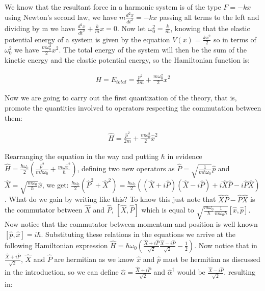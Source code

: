 \documentclass[
  journal=largetwo,
  year=2023,
]{cup-journal}
\begin{document}
We know that the resultant force in a harmonic system is of the type \(F = -kx\) using Newton's second law, we have \(m\frac{d^2x}{dt^2} = -kx\) passing all terms to the left and dividing by m we have \(\frac{d^2x}{dt^2} + \frac{k}{m}x = 0\). Now let \(\omega_0^{2} = \frac{k}{m}\), knowing that the elastic potential energy of a system is given by the equation \(V(x) = \frac{kx^2}{2}\) so in terms of \(\omega_0^{2}\) we have \(\frac{m\omega_0^{2}}{2}x^2\). The total energy of the system will then be the sum of the kinetic energy and the elastic potential energy, so the Hamiltonian function is:

\begin{equation}
  \begin{aligned}\label{eq:8}
    H = E_{total} = \frac{p^2}{2m} + \frac{m\omega_0^{2}}{2}x^2
  \end{aligned}
\end{equation}


Now we are going to carry out the first quantization of the theory, that is, promote the quantities involved to operators respecting the commutation between them:

\begin{equation}
  \begin{aligned}\label{eq:9}
    \hat{H} = \frac{\hat{p}^2}{2m} + \frac{m\omega_0^{2}}{2}\hat{x}^2
  \end{aligned}
\end{equation}


Rearranging the equation in the way and putting \(\hbar\) in evidence \(\hat{H} = \frac{\hbar\omega_0}{2}(\frac{\hat{p}^2}{m\hbar\omega_0} + \frac{m\omega\hat{x}^2}{\hbar})\), defining two new operators as \(\hat{P} = \sqrt{\frac{1}{m\hbar\omega_0}}\hat{p}\) and \(\hat{X} = \sqrt{\frac{m\omega_0}{\hbar}}\hat{x}\), we get: \(\frac{\hbar\omega_0}{2}(\hat{P}^2 + \hat{X}^2) = \frac{\hbar\omega_0}{2}((\hat{X} + i\hat{P})(\hat{X} - i\hat{P}) + i\hat{X}\hat{P} - i\hat{P}\hat{X})\). What do we gain by writing like this? To know this just note that \(\hat{X}\hat{P} - \hat{P}\hat{X}\) is the commutator between \(\hat{X}\) and \(\hat{P}\), \([\hat{X}, \hat{P}]\) which is equal to \(\sqrt{\frac{m\omega_0}{\hbar}\frac{1}{m\omega_0\hbar}}[\hat{x}, \hat{p}]\). Now notice that the commutator between momentum and position is well known \([\hat{p}, \hat{x}] = i\hbar\). Substituting these relations in the equations we arrive at the following Hamiltonian expression \(\hat{H} = \hbar\omega_0(\frac{\hat{X} + i\hat{P}}{\sqrt{2}}\frac{\hat{X}-i\hat{P}}{\sqrt{2}} - \frac{1}{2})\). Now notice that in \(\frac{\hat{X} + i\hat{P}}{\sqrt{2}}\), \(\hat{X}\) and \(\hat{P}\) are hermitian as we know \(\hat{x}\)  and \(\hat{p}\) must be hermitian as discussed in the introduction, so we can define \(\hat{\alpha} = \frac{\hat{X} + i\hat{P}}{\sqrt{2}}\) and \(\hat{\alpha}^{\dag}\) would be \(\frac{\hat{X} - i\hat{P}}{\sqrt{2}}\). resulting in:
\end{document}
